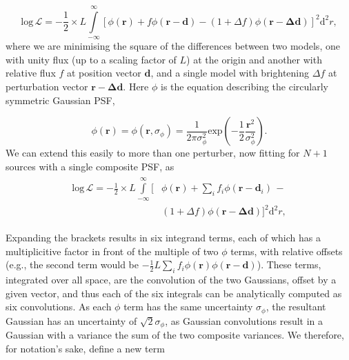 \documentclass[fleqn,usenatbib]{mnras}
\begin{document}
\begin{equation}
    \mathrm{log}\,\mathcal{L} = -\frac{1}{2}\times L \int\limits_{-\infty}^\infty\! \left[\phi(\mathbf{r}) + f\phi(\mathbf{r - d}) - (1 + \Delta f)\phi(\mathbf{r - \Delta d})\right]^2 \mathrm{d}^2r,
\label{eq:logL1}
\end{equation}
where we are minimising the square of the differences between two models, one with unity flux (up to a scaling factor of $L$) at the origin and another with relative flux $f$ at position vector $\mathbf{d}$, and a single model with brightening $\Delta f$ at perturbation vector $\mathbf{r - \Delta d}$. Here $\phi$ is the equation describing the circularly symmetric Gaussian PSF,

\begin{equation}
    \phi(\mathbf{r}) = \phi(\mathbf{r}, \sigma_\phi) = \frac{1}{2\pi \sigma_\phi^2}\mathrm{exp}\left(-\frac{1}{2} \frac{\mathbf{r}^2}{\sigma_\phi^2}\right).
\end{equation}
We can extend this easily to more than one perturber, now fitting for $N+1$ sources with a single composite PSF, as
\begin{align}
\begin{split}
    \mathrm{log}\,\mathcal{L} = -\frac{1}{2}\times L \int\limits_{-\infty}^\infty\! \bigg[&\phi(\mathbf{r}) + \sum_i f_i\phi(\mathbf{r} - \mathbf{d}_i)\, - \\&(1 + \Delta f)\phi(\mathbf{r - \Delta d})\bigg]^2 \mathrm{d}^2r,
\label{eq:logL2}
\end{split}
\end{align}

Expanding the brackets results in six integrand terms, each of which has a multiplicitive factor in front of the multiple of two $\phi$ terms, with relative offsets (e.g., the second term would be $-\frac{1}{2}L\sum_i f_i\phi(\mathbf{r})\phi(\mathbf{r - d})$). These terms, integrated over all space, are the convolution of the two Gaussians, offset by a given vector, and thus each of the six integrals can be analytically computed as six convolutions. As each $\phi$ term has the same uncertainty $\sigma_\phi$, the resultant Gaussian has an uncertainty of $\sqrt{2}\sigma_\phi$, as Gaussian convolutions result in a Gaussian with a variance the sum of the two composite variances. We therefore, for notation's sake, define a new term
\end{document}
